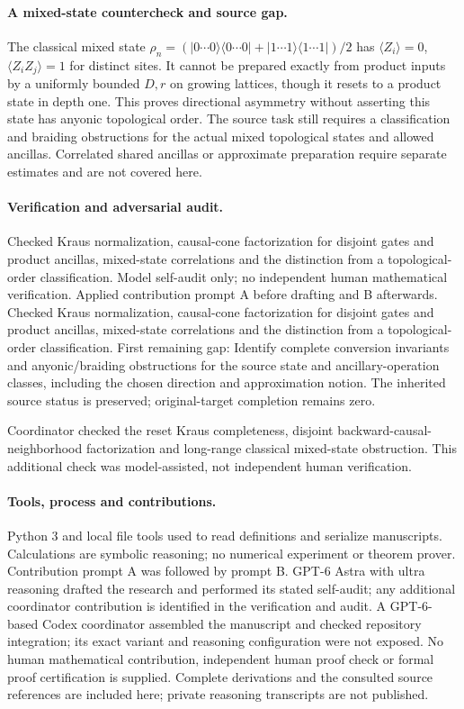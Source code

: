\documentclass[11pt]{article}
\begin{document}
\paragraph{A mixed-state countercheck and source gap.} The classical mixed state \(\rho_n=(|0\cdots0\rangle\langle0\cdots0|+|1\cdots1\rangle\langle1\cdots1|)/2\) has \(\langle Z_i\rangle=0\), \(\langle Z_iZ_j\rangle=1\) for distinct sites. It cannot be prepared exactly from product inputs by a uniformly bounded \(D,r\) on growing lattices, though it resets to a product state in depth one. This proves directional asymmetry without asserting this state has anyonic topological order. The source task still requires a classification and braiding obstructions for the actual mixed topological states and allowed ancillas. Correlated shared ancillas or approximate preparation require separate estimates and are not covered here.

\paragraph{Verification and adversarial audit.}
Checked Kraus normalization, causal-cone factorization for disjoint gates and product ancillas, mixed-state correlations and the distinction from a topological-order classification. Model self-audit only; no independent human mathematical verification. Applied contribution prompt A before drafting and B afterwards. Checked Kraus normalization, causal-cone factorization for disjoint gates and product ancillas, mixed-state correlations and the distinction from a topological-order classification. First remaining gap: Identify complete conversion invariants and anyonic/braiding obstructions for the source state and ancillary-operation classes, including the chosen direction and approximation notion. The inherited source status is preserved; original-target completion remains zero.

Coordinator checked the reset Kraus completeness, disjoint backward-causal-neighborhood factorization and long-range classical mixed-state obstruction. This additional check was model-assisted, not independent human verification.

\paragraph{Tools, process and contributions.}
Python 3 and local file tools used to read definitions and serialize manuscripts. Calculations are symbolic reasoning; no numerical experiment or theorem prover. Contribution prompt A was followed by prompt B. GPT-6 Astra with ultra reasoning drafted the research and performed its stated self-audit; any additional coordinator contribution is identified in the verification and audit. A GPT-6-based Codex coordinator assembled the manuscript and checked repository integration; its exact variant and reasoning configuration were not exposed. No human mathematical contribution, independent human proof check or formal proof certification is supplied. Complete derivations and the consulted source references are included here; private reasoning transcripts are not published.
\end{document}
